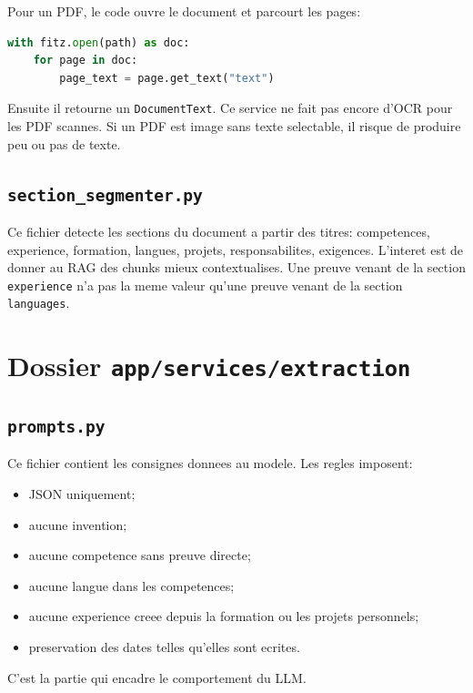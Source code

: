 \documentclass[12pt,a4paper]{article}
\begin{document}
Pour un PDF, le code ouvre le document et parcourt les pages:

\begin{lstlisting}[style=smartcode,language=Python]
with fitz.open(path) as doc:
    for page in doc:
        page_text = page.get_text("text")
\end{lstlisting}

Ensuite il retourne un \texttt{DocumentText}. Ce service ne fait pas encore d'OCR pour les PDF scannes. Si un PDF est image sans texte selectable, il risque de produire peu ou pas de texte.

\subsection{\texttt{section\_segmenter.py}}

Ce fichier detecte les sections du document a partir des titres: competences, experience, formation, langues, projets, responsabilites, exigences. L'interet est de donner au RAG des chunks mieux contextualises. Une preuve venant de la section \texttt{experience} n'a pas la meme valeur qu'une preuve venant de la section \texttt{languages}.

\section{Dossier \texttt{app/services/extraction}}

\subsection{\texttt{prompts.py}}

Ce fichier contient les consignes donnees au modele. Les regles imposent:

\begin{itemize}
  \item JSON uniquement;
  \item aucune invention;
  \item aucune competence sans preuve directe;
  \item aucune langue dans les competences;
  \item aucune experience creee depuis la formation ou les projets personnels;
  \item preservation des dates telles qu'elles sont ecrites.
\end{itemize}

C'est la partie qui encadre le comportement du LLM.
\end{document}
